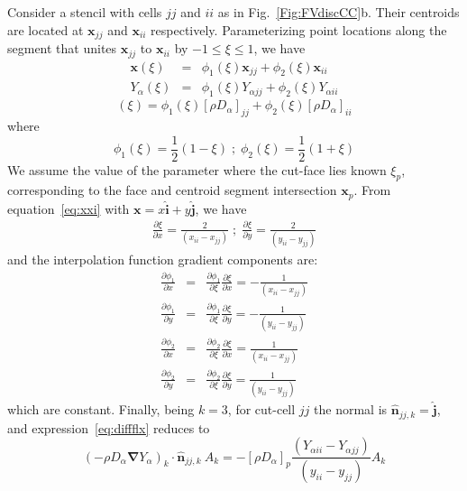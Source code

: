 Consider a stencil with cells $jj$ and $ii$ as in Fig.~\ref{Fig:FVdiscCC}b. Their centroids are located at $\mathbf{x}_{jj}$ and $\mathbf{x}_{ii}$ respectively. Parameterizing point locations along the segment that unites $\mathbf{x}_{jj}$ to $\mathbf{x}_{ii}$ by $-1 \le \xi \le 1$, we have
%
\begin{eqnarray}
   \mathbf{x}(\xi)  & = &  \phi_1(\xi) \mathbf{x}_{jj} + \phi_2(\xi) \mathbf{x}_{ii} \label{eq:xxi} \\
   Y_\alpha (\xi)  & = & \phi_1(\xi) Y_{\alpha jj} + \phi_2(\xi) Y_{\alpha ii}
\end{eqnarray}
%
\begin{equation}
[ \rho D_\alpha ] (\xi)  =  \phi_1(\xi) [ \rho D_\alpha ]_{jj} + \phi_2(\xi) [ \rho D_\alpha ]_{ii}
\end{equation}
where
%
\begin{equation}
   \phi_1(\xi) = \frac{1}{2} \left(1 - \xi \right) \; ; \; \phi_2(\xi) = \frac{1}{2} \left(1 + \xi \right)
\end{equation}
%
We assume the value of the parameter where the cut-face lies known $\xi_p$, corresponding to the face and centroid segment intersection $\mathbf{x}_p$. From equation~\eqref{eq:xxi} with $\mathbf{x}=x\hat{\mathbf{i}}+y\hat{\mathbf{j}}$, we have
%
\begin{eqnarray}
   \frac{\partial \xi}{\partial x} = \frac{2}{(x_{ii}-x_{jj})} \; ; \;  \frac{\partial \xi}{\partial y} = \frac{2}{(y_{ii}-y_{jj})}
\end{eqnarray}
%
and the interpolation function gradient components are:
%
\begin{eqnarray}
  \frac{\partial\phi_1}{\partial x} & = & \frac{\partial\phi_1}{\partial \xi} \frac{\partial \xi}{\partial x}=-\frac{1}{(x_{ii}-x_{jj})} \\
  \frac{\partial\phi_1}{\partial y} & = & \frac{\partial\phi_1}{\partial \xi} \frac{\partial \xi}{\partial y}=-\frac{1}{(y_{ii}-y_{jj})} \\
  \frac{\partial\phi_2}{\partial x} & = & \frac{\partial\phi_2}{\partial \xi} \frac{\partial \xi}{\partial x}= \frac{1}{(x_{ii}-x_{jj})} \\
  \frac{\partial\phi_2}{\partial y} & = & \frac{\partial\phi_2}{\partial \xi} \frac{\partial \xi}{\partial y}= \frac{1}{(y_{ii}-y_{jj})}
\end{eqnarray}
%
which are constant. Finally, being $k=3$, for cut-cell $jj$ the normal is $\hat{\mathbf{n}}_{jj,k}=\hat{\mathbf{j}}$, and expression~\eqref{eq:diffflx} reduces to
%
\begin{equation}
  \left( - \rho D_\alpha \boldsymbol{\nabla} Y_\alpha \right)_k \cdot \hat{\mathbf{n}}_{jj,k} \: A_k =
  -[ \rho D_\alpha ]_p \frac{\left(  Y_{\alpha ii} - Y_{\alpha jj} \right)}{(y_{ii}-y_{jj})}A_k
\end{equation}
